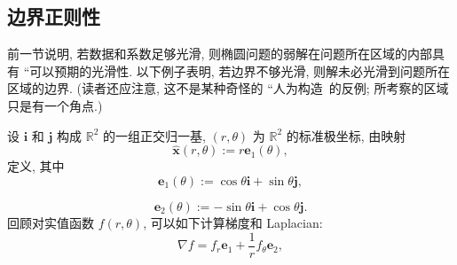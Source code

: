 \subsection{边界正则性}\label{sec:elliptic-boundary-regularity}

前一节说明, 若数据和系数足够光滑, 则椭圆问题的弱解在问题所在区域的内部具有 ``可以预期的光滑性\textquotesingle\textquotesingle. 以下例子表明, 若边界不够光滑, 则解未必光滑到问题所在区域的边界. (读者还应注意, 这不是某种奇怪的 ``人为构造\textquotesingle\textquotesingle\ 的反例; 所考察的区域只是有一个角点.)

\begin{Example}
\label{ex:nonsmooth-sector-boundary-regularity}
设 $\bm{i}$ 和 $\bm{j}$ 构成 $\mathbb{R}^2$ 的一组正交归一基, $(r,\theta)$ 为 $\mathbb{R}^2$ 的标准极坐标, 由映射
\begin{equation}\label{eq:corner-example-polar-coordinate-map}
\widehat{\bm{x}}(r,\theta):=r\bm{e}_1(\theta),
\end{equation}
定义, 其中
\begin{equation}\label{eq:corner-example-first-polar-basis-vector}
\bm{e}_1(\theta):=\cos\theta\bm{i}+\sin\theta\bm{j},
\end{equation}

\begin{equation}\label{eq:corner-example-second-polar-basis-vector}
\bm{e}_2(\theta):=-\sin\theta\bm{i}+\cos\theta\bm{j}.
\end{equation}
回顾对实值函数 $f(r,\theta)$, 可以如下计算梯度和 Laplacian:
\begin{equation}\label{eq:corner-example-polar-gradient-formula}
\nabla f=f_r\bm{e}_1+\frac{1}{r}f_\theta\bm{e}_2,
\end{equation}


\end{Example}

